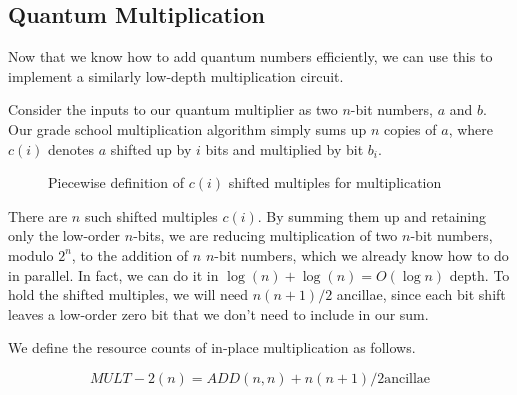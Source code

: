 \subsection{Quantum Multiplication}
\label{subsec:mult}

Now that we know how to add quantum numbers efficiently, we can use this
to implement a similarly low-depth multiplication circuit.

Consider the inputs to our quantum multiplier as two $n$-bit numbers,
$a$ and $b$.
Our grade school multiplication algorithm simply sums up $n$ copies of $a$,
where $c(i)$ denotes $a$ shifted up by $i$ bits and multiplied by bit $b_i$.

\begin{figure}
\caption{Piecewise definition of $c(i)$ shifted multiples for multiplication}
\end{figure}

There are $n$ such shifted multiples $c(i)$. By summing them up and retaining
only the low-order $n$-bits, we are reducing multiplication of two $n$-bit
numbers, modulo $2^n$, to the addition of $n$ $n$-bit numbers, which we
already know how to do in parallel. In fact, we can do it in
$\log(n) + \log(n) = O(\log n)$ depth.
To hold the shifted multiples, we will
need $n(n+1)/2$ ancillae, since each bit shift leaves a low-order zero bit
that we don't need to include in our sum.

We define the resource counts of in-place multiplication as follows.

\begin{displaymath}
MULT-2(n) = ADD(n, n) + n(n+1)/2 \text{ancillae}
\end{displaymath}